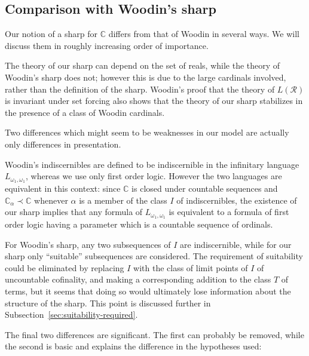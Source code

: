 \documentclass[
twoside,
]{article}
\theoremstyle{definition}
\theoremstyle{remark}
\newcommand\reals{\mathcal{R}}
\newcommand\chang{\mathbb{C}}
\begin{document}
\subsection{Comparison with Woodin's sharp}
Our notion of a sharp for $\chang$  differs from that of Woodin in
several ways.  We will discuss them in roughly increasing order of importance.

\begin{compactenum}
\item 
  The
  theory of our sharp can depend on the set of reals, while the theory of
  Woodin's sharp does not;    however this is due to the large
  cardinals involved, rather than the definition of the sharp.
  Woodin's proof that the theory of $L(\reals)$ is invariant under set
  forcing also shows that the theory of our sharp  stabilizes in the
  presence of a class of Woodin cardinals.
\end{compactenum}
\smallskip

Two differences which might seem to be weaknesses in our model are
actually only differences in presentation.

\begin{compactenum}
  \setcounter{enumi}{1}
\item 
  Woodin's indiscernibles are defined to be indiscernible in 
  the infinitary language $L_{\omega_1,\omega_1}$, whereas we use
  only first order logic.   However  the two languages are
  equivalent in this context: since $\chang$ is closed under countable sequences and
  $\chang_{\alpha}\prec \chang$ whenever $\alpha$ is a member of the
  class $I$ of indiscernibles, the existence of our sharp implies that
  any formula of $L_{\omega_1,\omega_1}$ is equivalent to a formula of
  first order logic having a parameter which is a countable sequence
  of ordinals.

\item 
  For Woodin's sharp, any two subsequences of $I$ are indiscernible,
  while for our sharp only ``suitable''  subsequences are considered.
  The requirement of suitability could be eliminated by replacing $I$ with the class
  of 
  limit points of $I$ of uncountable cofinality, and making a
  corresponding addition to the class
  $T$ of terms, but it seems that doing so would ultimately 
  lose information about the structure
  of the sharp.  This point is discussed further in
  Subsection~\ref{sec:suitability-required}. 
\end{compactenum}
\smallskip

The final two differences are significant.    The first can probably
be removed,  while
the second is basic and explains the difference in the hypotheses used:
\end{document}
